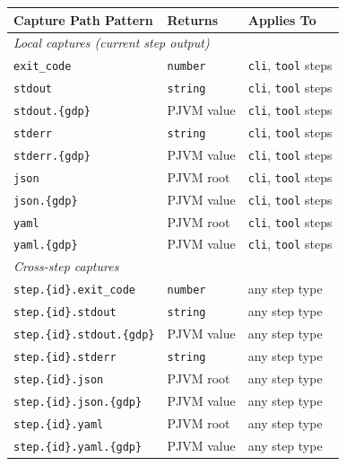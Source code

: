 \begin{table}[ht]
\centering
\begin{tabular}{p{5.0cm}p{2.0cm}p{5.0cm}}
\hline
\textbf{Capture Path Pattern} & \textbf{Returns} & \textbf{Applies To} \\
\hline
\multicolumn{3}{l}{\textit{Local captures (current step output)}} \\
\hline
\texttt{exit\_code}            & \texttt{number}      & \texttt{cli}, \texttt{tool} steps \\
\texttt{stdout}                & \texttt{string}      & \texttt{cli}, \texttt{tool} steps \\
\texttt{stdout.\{gdp\}}        & PJVM value           & \texttt{cli}, \texttt{tool} steps \\
\texttt{stderr}                & \texttt{string}      & \texttt{cli}, \texttt{tool} steps \\
\texttt{stderr.\{gdp\}}        & PJVM value           & \texttt{cli}, \texttt{tool} steps \\
\texttt{json}                  & PJVM root            & \texttt{cli}, \texttt{tool} steps \\
\texttt{json.\{gdp\}}          & PJVM value           & \texttt{cli}, \texttt{tool} steps \\
\texttt{yaml}                  & PJVM root            & \texttt{cli}, \texttt{tool} steps \\
\texttt{yaml.\{gdp\}}          & PJVM value           & \texttt{cli}, \texttt{tool} steps \\
\hline
\multicolumn{3}{l}{\textit{Cross-step captures}} \\
\hline
\texttt{step.\{id\}.exit\_code}        & \texttt{number}  & any step type \\
\texttt{step.\{id\}.stdout}            & \texttt{string}  & any step type \\
\texttt{step.\{id\}.stdout.\{gdp\}}    & PJVM value       & any step type \\
\texttt{step.\{id\}.stderr}            & \texttt{string}  & any step type \\
\texttt{step.\{id\}.json}              & PJVM root        & any step type \\
\texttt{step.\{id\}.json.\{gdp\}}      & PJVM value       & any step type \\
\texttt{step.\{id\}.yaml}              & PJVM root        & any step type \\
\texttt{step.\{id\}.yaml.\{gdp\}}      & PJVM value       & any step type \\

\end{tabular}
\end{table}
